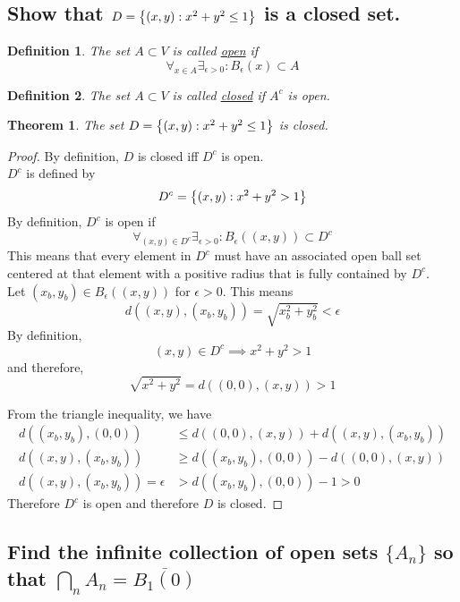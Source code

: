 \documentclass[]{article}
\newtheorem{definition}{Definition}
\newtheorem{theorem}{Theorem}
\begin{document}
\subsection{Show that $D = \qty{(x,y) : x^2 + y^2 \leq 1}$ is a closed set.}
\begin{definition}
    The set $A \subset V$ is called \underline{open} if 
    $$\forall_{x\in A} \exists_{\epsilon>0} : B_\epsilon(x)\subset A$$
\end{definition}
\begin{definition}
    The set $A \subset V$ is called \underline{closed} if $A^c$ is open.
\end{definition}
\begin{theorem}
    The set $D = \qty{(x,y) : x^2 + y^2 \leq 1}$ is closed.
\end{theorem}
\begin{proof}
    By definition, $D$ is closed iff $D^c$ is open.\\
    $D^c$ is defined by
    $$D^c = \qty{(x,y) : x^2 + y^2 > 1}$$
    By definition, $D^c$ is open if
    $$\forall_{(x,y) \in D^c} \exists_{\epsilon>0}: B_\epsilon ((x,y)) \subset D^c$$
    This means that every element in $D^c$ must have an associated open ball set centered 
    at that element with a positive radius that is fully contained by $D^c$.\\
    Let $(x_b,y_b) \in B_\epsilon ((x,y))$ for $\epsilon>0$.
    This means
    $$d((x,y),(x_b,y_b)) = \sqrt{x_b^2 + y_b^2} < \epsilon$$
    By definition,
    $$(x,y) \in D^c \implies x^2 + y^2 > 1$$
    and therefore,
    $$\sqrt{x^2 + y^2} = d((0,0),(x,y)) > 1$$

    From the triangle inequality, we have
    \begin{align*}
        d((x_b,y_b),(0,0)) &\leq d((0,0),(x,y)) + d((x,y),(x_b,y_b))\\
        d((x,y),(x_b,y_b)) &\geq d((x_b,y_b),(0,0)) - d((0,0),(x,y))\\
        d((x,y),(x_b,y_b)) = \epsilon &> d((x_b,y_b),(0,0)) - 1 > 0
    \end{align*}
    Therefore $D^c$ is open and therefore $D$ is closed.
\end{proof}

\newpage
\subsection{Find the infinite collection of open sets 
$\{A_n\}$ so that $\bigcap_n A_n = \overline{B_1(0)}$}
\end{document}
